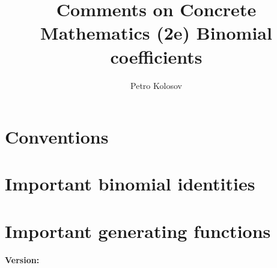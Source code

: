 \documentclass[12pt,letterpaper,oneside,reqno]{amsart}
\title[Comments on Concrete Mathematics (2e) Binomial coefficients]
{Comments on Concrete Mathematics (2e) Binomial coefficients}
\author[Petro Kolosov]{Petro Kolosov}
\numberwithin{equation}{section}
\begin{document}
    \maketitle

    \tableofcontents


    \section{Conventions}\label{sec:conventions}
    


    \section{Important binomial identities}\label{sec:important-binomial-identities}
    


    \section{Important generating functions}\label{sec:important-generating-functions}
    

    
    
    \noindent \textbf{Version:} 
\end{document}
